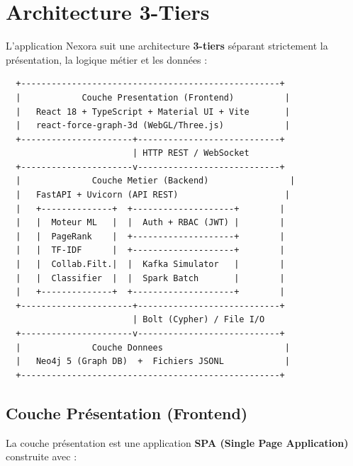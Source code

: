 \documentclass[12pt,a4paper]{article}
\begin{document}
\section{Architecture 3-Tiers}

L'application Nexora suit une architecture \textbf{3-tiers} séparant strictement la présentation, la logique métier et les données :

\begin{verbatim}
  +---------------------------------------------------+
  |            Couche Presentation (Frontend)          |
  |   React 18 + TypeScript + Material UI + Vite       |
  |   react-force-graph-3d (WebGL/Three.js)            |
  +----------------------+----------------------------+
                         | HTTP REST / WebSocket
  +----------------------v----------------------------+
  |              Couche Metier (Backend)                |
  |   FastAPI + Uvicorn (API REST)                     |
  |   +--------------+  +--------------------+        |
  |   |  Moteur ML   |  |  Auth + RBAC (JWT) |        |
  |   |  PageRank    |  +--------------------+        |
  |   |  TF-IDF      |  +--------------------+        |
  |   |  Collab.Filt.|  |  Kafka Simulator   |        |
  |   |  Classifier  |  |  Spark Batch       |        |
  |   +--------------+  +--------------------+        |
  +----------------------+----------------------------+
                         | Bolt (Cypher) / File I/O
  +----------------------v----------------------------+
  |              Couche Donnees                        |
  |   Neo4j 5 (Graph DB)  +  Fichiers JSONL            |
  +---------------------------------------------------+
\end{verbatim}

\subsection{Couche Présentation (Frontend)}

La couche présentation est une application \textbf{SPA (Single Page Application)} construite avec :
\end{document}
